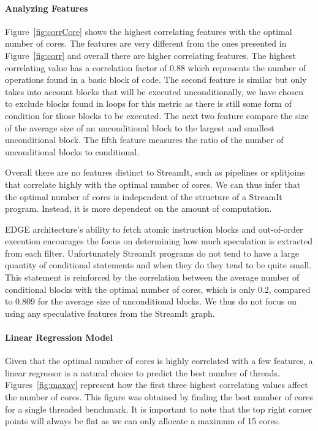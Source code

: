 \paragraph{Analyzing Features}

Figure~\ref{fig:corrCore} shows the highest correlating features with the optimal number of cores.
The features are very different from the ones presented in Figure~\ref{fig:corr} and overall there are higher correlating features.
The highest correlating value has a correlation factor of 0.88 which represents the number of operations found in a basic block of code.
The second feature is similar but only takes into account blocks that will be executed unconditionally, we have chosen to exclude blocks found in loops for this metric as there is still some form of condition for those blocks to be executed.
The next two feature compare the size of the average size of an unconditional block to the largest and smallest unconditional block.
The fifth feature measures the ratio of the number of unconditional blocks to conditional.

Overall there are no features distinct to StreamIt, such as pipelines or splitjoins that correlate highly with the optimal number of cores.
We can thus infer that the optimal number of cores is independent of the structure of a StreamIt program.
Instead, it is more dependent on the amount of computation.

EDGE architecture's ability to fetch atomic instruction blocks and out-of-order execution encourages the focus on determining how much speculation is extracted from each filter.
Unfortunately StreamIt programs do not tend to have a large quantity of conditional statements and when they do they tend to be quite small.
This statement is reinforced by the correlation between the average number of conditional blocks with the optimal number of cores, which is only 0.2, compared to 0.809 for the average size of unconditional blocks.
We thus do not focus on using any speculative features from the StreamIt graph.

\paragraph{Linear Regression Model}
Given that the optimal number of cores is highly correlated with a few features, a linear regressor is a natural choice to predict the best number of threads.
Figures~\ref{fig:maxav} represent how the first three highest correlating values affect the number of cores.
This figure was obtained by finding the best number of cores for a single threaded benchmark.
It is important to note that the top right corner points will always be flat as we can only allocate a maximum of 15 cores.

